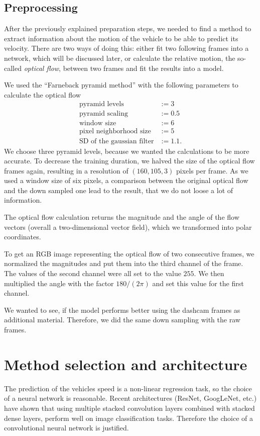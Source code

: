 \documentclass[conference]{IEEEtran}
\begin{document}
\subsection{Preprocessing}

After the previously explained preparation steps, we needed to find a method to extract information 
about the motion of the vehicle to be able to predict its velocity. There are two ways of doing this: 
either fit two following frames into a network, which will be discussed later, or calculate the relative 
motion, the so-called \emph{optical flow}, between two frames and fit the results into a model.

We used the \enquote{Farneback pyramid method} \cite{Farneback2003} with  the following parameters to 
calculate the optical flow
\begin{align*}
\text{pyramid levels} &:= 3\\
\text{pyramid scaling} &:= 0.5\\
\text{window size} &:= 6\\
\text{pixel neighborhood size} &:= 5\\
\text{SD of the gaussian filter} &:= 1.1.
\end{align*}
We choose three pyramid levels, because we wanted the calculations to be more accurate. To decrease the 
training duration, we halved the size of the optical flow frames again, resulting in a resolution of
$(160,105,3)$ pixels per frame. As we used a window size of six pixels, a comparison between the 
original optical flow and the down sampled one lead to the result, that we do not loose a lot of 
information.

The optical flow calculation returns the magnitude and
the angle of the flow vectors (overall a two-dimensional vector field), which we transformed into polar 
coordinates.

To get an RGB image representing the
optical flow of two consecutive frames, we normalized the magnitudes and put them into the third channel 
of the frame. The values
of the second channel were all set to the value $255$. We then multiplied the angle with the factor 
$180/(2\pi)$ and set this value 
for the first channel.

We wanted to see, if the model performs better using the dashcam frames as additional material. 
Therefore, we did the same down sampling with the raw frames.

\section{Method selection and architecture}
The prediction of the vehicles speed is a non-linear regression task, so the choice of a neural network 
is reasonable. Recent architectures (ResNet, GoogLeNet, etc.) have shown that using multiple stacked 
convolution layers combined with stacked dense layers, perform well on image classification tasks. 
Therefore the choice of a convolutional neural network is justified.
\end{document}
